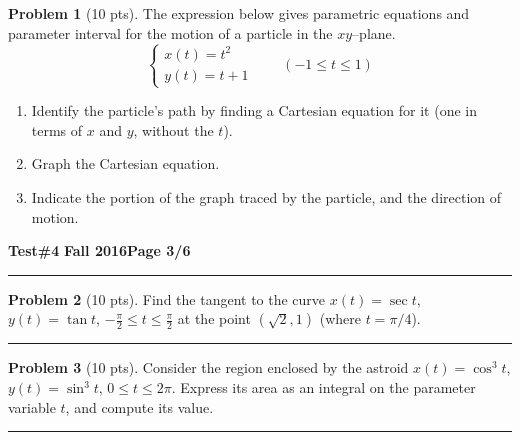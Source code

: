 \documentclass[12pt]{article}
\theoremstyle{definition}
\newtheorem{problem}{Problem}
\begin{document}
\bigskip
\begin{problem}[10 pts]
The expression below gives parametric equations and parameter interval for the motion of a particle in the $xy$--plane.  
\begin{equation*}
\begin{cases}
x(t) = t^2 \\
y(t) = t+1
\end{cases}
\qquad (-1 \leq t \leq 1)
\end{equation*}
\begin{enumerate}
\item Identify the particle's path by finding a Cartesian equation for it (one in terms of $x$ and $y$, without the $t$).
\vspace{2cm}
\begin{flushright}
\end{flushright}
\item Graph the Cartesian equation.
\item Indicate the portion of the graph traced by the particle, and the direction of motion.
\end{enumerate}
\end{problem}
\newpage


\hfill{\large\bf Test\#4}\hfill{\large\bf
  Fall 2016}\hfill{\large\bf Page 3/6}\hrule


\bigskip
\begin{problem}[10 pts]
Find the tangent to the curve $x(t) = \sec t$, $y(t) = \tan t$, $-\tfrac{\pi}{2} \leq t \leq \tfrac{\pi}{2}$ at the point $(\sqrt{2}, 1)$ (where $t={\pi}/{4}$).
\vspace{4.5cm}
\begin{flushright}
\end{flushright}
\end{problem}
\hrule

\begin{problem}[10 pts]
Consider the region enclosed by the astroid $x(t) = \cos^3 t$, $y(t) = \sin^3 t$, $0 \leq t \leq 2\pi$.  Express its area as an integral on the parameter variable $t$, and compute its value.  
\vspace{4.5cm}
\begin{flushright}
\end{flushright}
\end{problem}
\hrule
\end{document}
